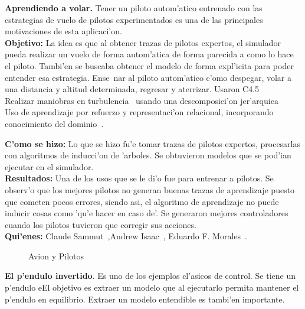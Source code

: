 \documentclass[11pt]{article}
\begin{document}
\textbf{Aprendiendo a volar.} Tener un piloto autom'atico entrenado con las estrategias de vuelo de pilotos experimentados es una de las principales motivaciones de esta aplicaci'on.\\
\textbf{Objetivo:} La idea es que al obtener trazas de pilotos expertos, el simulador pueda realizar un vuelo de forma autom'atica de forma parecida a como lo hace el piloto. Tambi'en se buscaba obtener el modelo de forma expl'icita para poder entender esa estrategia. Ense~nar al piloto autom'atico c'omo despegar, volar a una distancia y altitud determinada, regresar y aterrizar. Usaron C4.5~\cite{Sammut92learningto}\\
Realizar maniobras en turbulencia~\cite{Isaac03goal-directedlearning} usando una descomposici'on jer'arquica\\
Uso de aprendizaje por refuerzo y representaci'on relacional, incorporando conocimiento del dominio~\cite{Morales04learningto}.


\textbf{C'omo se hizo:} Lo que se hizo fu'e tomar trazas de pilotos expertos, procesarlas con algoritmos de inducci'on de 'arboles. Se obtuvieron modelos que se pod'ian ejecutar en el simulador. \\
\textbf{Resultados:} Una de los usos que se le di'o fue para entrenar a pilotos. Se observ'o que los mejores pilotos no generan buenas trazas de aprendizaje puesto que cometen pocos errores, siendo asi, el algoritmo de aprendizaje no puede inducir cosas como 'qu'e hacer en caso de'. Se generaron mejores controladores cuando los pilotos tuvieron que corregir sus acciones.\\
\textbf{Qui'enes:} Claude Sammut~\cite{Sammut92learningto},Andrew Isaac~\cite{Isaac03goal-directedlearning}, Eduardo F. Morales~\cite{Morales04learningto}.

\begin{figure}[h]
\begin{center}

\caption{Avion y Pilotos}
  \label{fig:volar}
\end{center}
\end{figure} 


\medskip
\noindent

\textbf{El p'endulo invertido}. Es uno de los ejemplos cl'asicos de control. Se tiene un p'endulo eEl objetivo es extraer un modelo que al ejecutarlo permita mantener el p'endulo en equilibrio. Extraer un modelo entendible es tambi'en importante.~\cite{Suc99skillmodelling}~\cite{And99modellingof}
\end{document}
